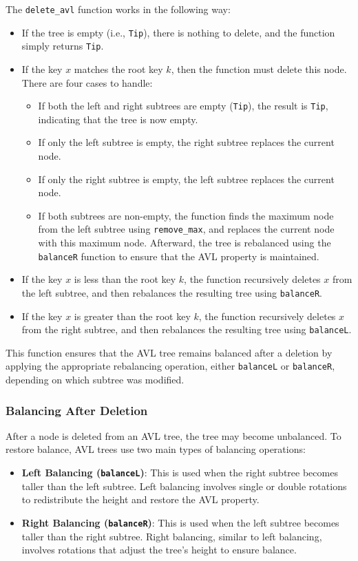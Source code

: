 The \texttt{delete\_avl} function works in the following way:
\begin{itemize}
    \item If the tree is empty (i.e., \texttt{Tip}), there is nothing to delete, and the function simply returns \texttt{Tip}.
    \item If the key \( x \) matches the root key \( k \), then the function must delete this node. There are four cases to handle:
    \begin{itemize}
        \item If both the left and right subtrees are empty (\texttt{Tip}), the result is \texttt{Tip}, indicating that the tree is now empty.
        \item If only the left subtree is empty, the right subtree replaces the current node.
        \item If only the right subtree is empty, the left subtree replaces the current node.
        \item If both subtrees are non-empty, the function finds the maximum node from the left subtree using \texttt{remove\_max}, and replaces the current node with this maximum node. Afterward, the tree is rebalanced using the \texttt{balanceR} function to ensure that the AVL property is maintained.
    \end{itemize}
    \item If the key \( x \) is less than the root key \( k \), the function recursively deletes \( x \) from the left subtree, and then rebalances the resulting tree using \texttt{balanceR}.
    \item If the key \( x \) is greater than the root key \( k \), the function recursively deletes \( x \) from the right subtree, and then rebalances the resulting tree using \texttt{balanceL}.
\end{itemize}

This function ensures that the AVL tree remains balanced after a deletion by applying the appropriate rebalancing operation, either \texttt{balanceL} or \texttt{balanceR}, depending on which subtree was modified.

\subsubsection{Balancing After Deletion}

After a node is deleted from an AVL tree, the tree may become unbalanced. To restore balance, AVL trees use two main types of balancing operations:
\begin{itemize}
    \item \textbf{Left Balancing (\texttt{balanceL})}: This is used when the right subtree becomes taller than the left subtree. Left balancing involves single or double rotations to redistribute the height and restore the AVL property.
    \item \textbf{Right Balancing (\texttt{balanceR})}: This is used when the left subtree becomes taller than the right subtree. Right balancing, similar to left balancing, involves rotations that adjust the tree's height to ensure balance.
\end{itemize}

